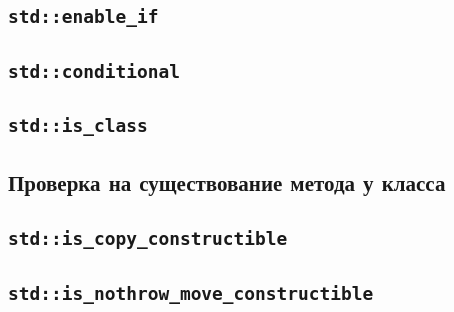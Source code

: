\documentclass{article}
\begin{document}
\subsection*{\texttt{std::enable\_if}}
\subsection*{\texttt{std::conditional}}
\subsection*{\texttt{std::is\_class}}


\subsection*{Проверка на существование метода у класса}
\subsection*{\texttt{std::is\_copy\_constructible}}
\subsection*{\texttt{std::is\_nothrow\_move\_constructible}}
\end{document}
